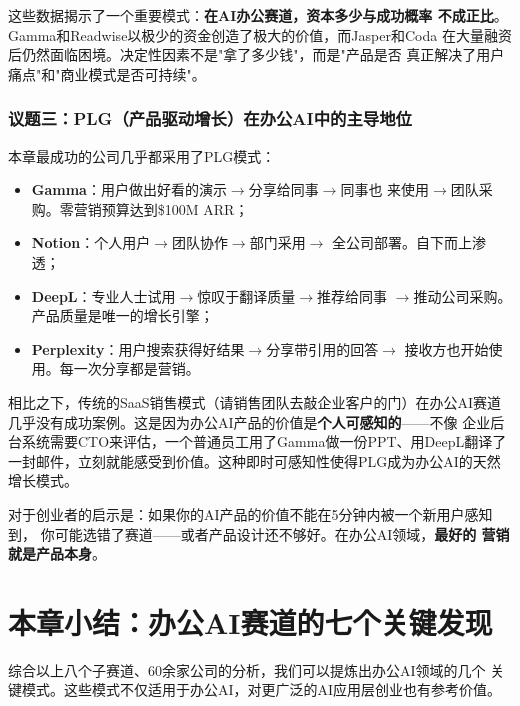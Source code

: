 这些数据揭示了一个重要模式：\textbf{在AI办公赛道，资本多少与成功概率
不成正比}。Gamma和Readwise以极少的资金创造了极大的价值，而Jasper和Coda
在大量融资后仍然面临困境。决定性因素不是"拿了多少钱"，而是"产品是否
真正解决了用户痛点"和"商业模式是否可持续"。

\subsubsection{议题三：PLG（产品驱动增长）在办公AI中的主导地位}
本章最成功的公司几乎都采用了PLG模式：

\begin{itemize}
  \item \textbf{Gamma}：用户做出好看的演示$\to$分享给同事$\to$同事也
    来使用$\to$团队采购。零营销预算达到\$100M ARR；
  \item \textbf{Notion}：个人用户$\to$团队协作$\to$部门采用$\to$
    全公司部署。自下而上渗透；
  \item \textbf{DeepL}：专业人士试用$\to$惊叹于翻译质量$\to$推荐给同事
    $\to$推动公司采购。产品质量是唯一的增长引擎；
  \item \textbf{Perplexity}：用户搜索获得好结果$\to$分享带引用的回答$\to$
    接收方也开始使用。每一次分享都是营销。
\end{itemize}

相比之下，传统的SaaS销售模式（请销售团队去敲企业客户的门）在办公AI赛道
几乎没有成功案例。这是因为办公AI产品的价值是\textbf{个人可感知的}——不像
企业后台系统需要CTO来评估，一个普通员工用了Gamma做一份PPT、用DeepL翻译了
一封邮件，立刻就能感受到价值。这种即时可感知性使得PLG成为办公AI的天然
增长模式。

对于创业者的启示是：如果你的AI产品的价值不能在5分钟内被一个新用户感知到，
你可能选错了赛道——或者产品设计还不够好。在办公AI领域，\textbf{最好的
营销就是产品本身}。



\section*{本章小结：办公AI赛道的七个关键发现}

综合以上八个子赛道、60余家公司的分析，我们可以提炼出办公AI领域的几个
关键模式。这些模式不仅适用于办公AI，对更广泛的AI应用层创业也有参考价值。

